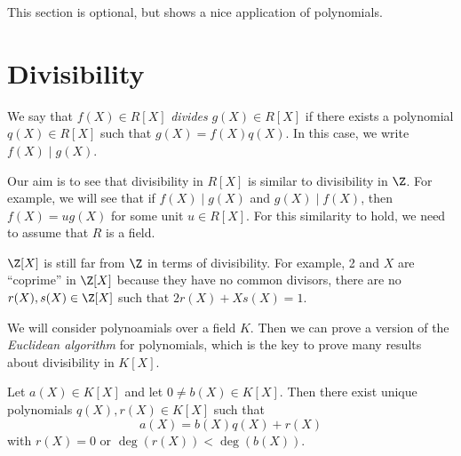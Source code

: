 \documentclass[12pt]{amsproc}
\begin{document}
This section is optional, but shows a nice application of polynomials.

\section{Divisibility}

\begin{definition}
    We say that $f(X)\in R[X]$ \emph{divides} $g(X)\in R[X]$ if there exists a polynomial $q(X)\in R[X]$ such that $g(X)=f(X)q(X)$. In this case, we write $f(X)\mid g(X)$.
\end{definition}

Our aim is to see that divisibility in $R[X]$ is similar to divisibility in $\Z$. 
For example, we will see that if $f(X)\mid g(X)$ and $g(X)\mid f(X)$, then $f(X)=u g(X)$ for some unit $u\in R[X]$. For this similarity to hold, we need to assume that $R$ is a field. 

\begin{example}
$\Z[X]$ is still far from $\Z$ in terms of divisibility. For example, 
2 and $X$ are ``coprime'' in $\Z[X]$ because they have no common divisors, 
there are no $r(X),s(X)\in \Z[X]$ such that $2r(X)+Xs(X)=1$.
\end{example}

We will consider polynoamials over a field $K$. Then we can 
prove a version of the \emph{Euclidean algorithm} for polynomials, which is the key to prove many results about divisibility in $K[X]$.

\begin{theorem}
    Let $a(X)\in K[X]$ and let $0\ne b(X)\in K[X]$. 
    Then there exist unique polynomials $q(X),r(X)\in K[X]$ such that
    \[
    a(X)=b(X)q(X)+r(X)
    \]
    with $r(X)=0$ or $\deg(r(X))<\deg(b(X))$.
\end{theorem}
\end{document}
